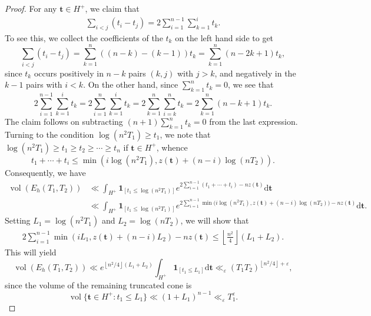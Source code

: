 \documentclass[11pt,reqno]{amsart}
\theoremstyle{definition}
\theoremstyle{remark}
\newcommand{\vol}{\operatorname{vol}}
\numberwithin{equation}{section}
\numberwithin{thm}{section}
\numberwithin{table}{section}
\begin{document}
\begin{proof}
For any $\mathbf{t} \in H^+$, we  claim that
\begin{align*}
        \sum_{i<j}(t_i-t_j) 
        = 2\sum_{i=1}^{n-1} \sum_{k=1}^i t_k. 
\end{align*} 
To see this, we collect the coefficients of the $t_k$ on the left hand side to get 
\[
    \sum_{i < j} (t_i - t_j) = \sum_{k=1}^{n} ((n-k)-(k-1)) t_k = \sum_{k=1}^{n} (n-2k + 1) t_k,
\]
since $t_k$ occurs positively in $n-k$ pairs $(k,j)$ with $j >k$, and negatively in the $k-1$ pairs with $i<k$. On the other hand, 
since $\sum_{k=1}^n t_k = 0$, 
we see that 
\[
2\sum_{i=1}^{n-1} \sum_{k=1}^i t_k=
    2\sum_{i=1}^n \sum_{k=1}^i t_k = 2 \sum_{k=1}^n \sum_{i=k}^n t_k = 2 \sum_{k=1}^n (n-k+1)t_k.
\]
The claim follows on subtracting $(n+1)\sum_{k=1}^n t_k = 0$ from the last expression.
Turning to the condition $\log(n^2T_1) \ge t_1$, we note that 
$\log(n^2T_1) \ge t_1 \ge t_2 \ge \cdots \ge t_n$ if  $\mathbf{t}\in H^+$, whence
\[
   t_1 + \cdots + t_i \le \min \left( 
   i \log(n^2T_1), z(\mathbf{t}) + (n-i) \log(nT_2)
   \right).
\]
Consequently, we have  
\begin{align*}
        \vol(E_h(T_1, T_2)) &\ll \int_{H^+}  \mathbf{1}_{[t_1 \le \log(n^2T_1)]} e^{2 \sum_{i=1}^{n-1} (t_1 + \cdots+ t_i)-n z(\mathbf{t})}\mathrm{d}\mathbf{t} \\
        &\ll
        \int_{H^+}  \mathbf{1}_{[t_1 \le \log(n^2T_1)]} e^{2 \sum_{i=1}^{n-1} \min \big( 
   i \log(n^2T_1), z(\mathbf{t}) + (n-i) \log(nT_2)
   \big) -n z(\mathbf{t})}\mathrm{d}\mathbf{t} .
\end{align*}
Setting $L_1 = \log(n^2T_1)$ and $L_2 = \log(nT_2)$, we will show that 
\begin{align}\label{eq:wherensquaredoverfourappears}
    2 \sum_{i=1}^{n-1} \min \left( 
   i L_1, z(\mathbf{t}) + (n-i) L_2
   \right) -n z(\mathbf{t}) \le \left\lfloor \frac{n^2}{4}\right\rfloor ( L_1 + L_2 ).
\end{align}
This will yield 
\[
    \vol(E_h(T_1, T_2)) \ll e^{ \left\lfloor n^2/4 \right\rfloor ( L_1 + L_2 ) } 
    \int_{H^+} \mathbf{1}_{[t_1 \le L_1]} \mathrm{d}\mathbf{t} \ll_{\varepsilon} (T_1  T_2)^{ \left\lfloor n^2/4 \right\rfloor + \varepsilon },
\]
since the volume of the remaining truncated cone is 
\[
    \vol \{ \mathbf{t} \in H^+: t_1 \le L_1 \} \ll (1+ L_1)^{n-1} \ll_{\varepsilon} T_1^\varepsilon.
\]


\end{proof}
\end{document}
